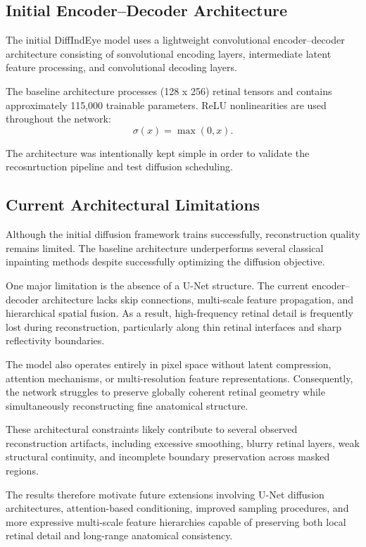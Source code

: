 \documentclass[12pt,oneside]{article}
\begin{document}
\subsection*{Initial Encoder--Decoder Architecture}

The initial DiffIndEye model uses a lightweight convolutional encoder--decoder architecture consisting of sonvolutional encoding layers, intermediate latent feature processing, and convolutional decoding layers.



The baseline architecture processes (128 x 256) retinal tensors and contains approximately 115,000 trainable parameters.
ReLU nonlinearities are used throughout the network:
\[
\sigma(x)=\max(0,x).
\]

The architecture was intentionally kept simple in order to validate the recosnrtuction pipeline and test diffusion scheduling.

\subsection*{Current Architectural Limitations}

Although the initial diffusion framework trains successfully, reconstruction quality remains limited. The baseline architecture underperforms several classical inpainting methods despite successfully optimizing the diffusion objective.

One major limitation is the absence of a U-Net structure. The current encoder--decoder architecture lacks skip connections, multi-scale feature propagation, and hierarchical spatial fusion. As a result, high-frequency retinal detail is frequently lost during reconstruction, particularly along thin retinal interfaces and sharp reflectivity boundaries.

The model also operates entirely in pixel space without latent compression, attention mechanisms, or multi-resolution feature representations. Consequently, the network struggles to preserve globally coherent retinal geometry while simultaneously reconstructing fine anatomical structure.

These architectural constraints likely contribute to several observed reconstruction artifacts, including excessive smoothing, blurry retinal layers, weak structural continuity, and incomplete boundary preservation across masked regions.

The results therefore motivate future extensions involving U-Net diffusion architectures, attention-based conditioning, improved sampling procedures, and more expressive multi-scale feature hierarchies capable of preserving both local retinal detail and long-range anatomical consistency.
\end{document}
